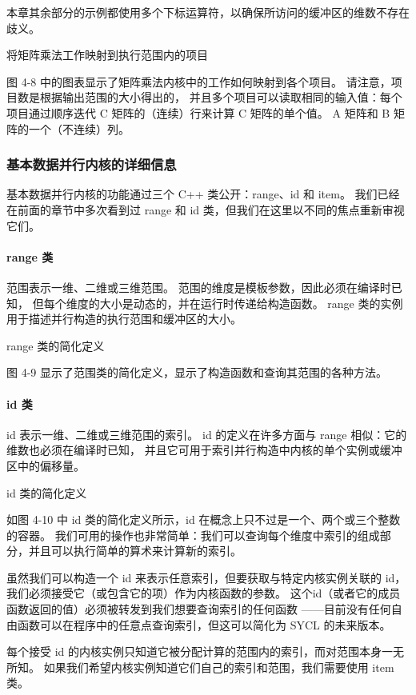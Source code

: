 本章其余部分的示例都使用多个下标运算符，以确保所访问的缓冲区的维数不存在歧义。

{\color{red} 将矩阵乘法工作映射到执行范围内的项目}

图 4-8 中的图表显示了矩阵乘法内核中的工作如何映射到各个项目。 
请注意，项目数是根据输出范围的大小得出的，
并且多个项目可以读取相同的输入值：每个项目通过顺序迭代 C 矩阵的（连续）行来计算 C 矩阵的单个值。 
A 矩阵和 B 矩阵的一个（不连续）列。

\subsubsection{基本数据并行内核的详细信息}
基本数据并行内核的功能通过三个 C++ 类公开：range、id 和 item。 
我们已经在前面的章节中多次看到过 range 和 id 类，但我们在这里以不同的焦点重新审视它们。

\paragraph{range 类}

范围表示一维、二维或三维范围。 范围的维度是模板参数，因此必须在编译时已知，
但每个维度的大小是动态的，并在运行时传递给构造函数。 range 类的实例用于描述并行构造的执行范围和缓冲区的大小。

{\color{red} range 类的简化定义}

图 4-9 显示了范围类的简化定义，显示了构造函数和查询其范围的各种方法。

\paragraph{id 类}

id 表示一维、二维或三维范围的索引。 
id 的定义在许多方面与 range 相似：它的维数也必须在编译时已知，
并且它可用于索引并行构造中内核的单个实例或缓冲区中的偏移量。

{\color{red} id 类的简化定义}

如图 4-10 中 id 类的简化定义所示，id 在概念上只不过是一个、两个或三个整数的容器。 
我们可用的操作也非常简单：我们可以查询每个维度中索引的组成部分，并且可以执行简单的算术来计算新的索引。

虽然我们可以构造一个 id 来表示任意索引，但要获取与特定内核实例关联的 id，
我们必须接受它（或包含它的项）作为内核函数的参数。 
这个id（或者它的成员函数返回的值）必须被转发到我们想要查询索引的任何函数
——目前没有任何自由函数可以在程序中的任意点查询索引，但这可以简化为 SYCL 的未来版本。

每个接受 id 的内核实例只知道它被分配计算的范围内的索引，而对范围本身一无所知。 
如果我们希望内核实例知道它们自己的索引和范围，我们需要使用 item 类。

